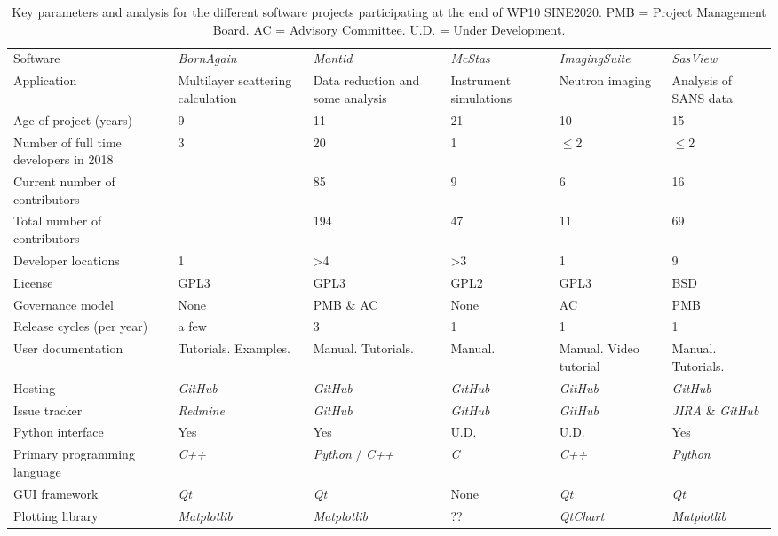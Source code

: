 \documentclass[jnr]{iosart2x}
\begin{document}
\begin{table}
 \begin{tabular}{llllll}
 Software                               & {\it BornAgain} \cite{bornagain}  & {\it Mantid} \cite{mantid} &{\it McStas} \cite{mcstas}  & {\it ImagingSuite} \cite{ImagingSuite} &{\it SasView} \cite{sasview} \\
 Application                            & Multilayer scattering calculation & Data reduction and some analysis & Instrument simulations & Neutron imaging & Analysis of SANS data \\
 Age of project (years)                 & 9 & 11 & 21 & 10 & 15 \\
 Number of full time developers in 2018 & 3 & 20 & 1 & $\le$2 & $\le$2 \\
 Current number of contributors         &  & 85  & 9 & 6 & 16 \\
 Total number of contributors           &  & 194 & 47 & 11 & 69 \\
 Developer locations                    & 1 & >4 & >3 & 1 & 9 \\
 License                                & GPL3 & GPL3 & GPL2 & GPL3 & BSD \\
 Governance model                       & None & PMB \& AC  & None & AC & PMB \\
 Release cycles (per year)              & a few & 3 & 1 & 1 & 1\\
 User documentation                     & Tutorials. Examples. & Manual. Tutorials. & Manual. & Manual. Video tutorial & Manual. Tutorials. \\
 Hosting                                & {\it GitHub} & {\it GitHub} & {\it GitHub} & {\it GitHub} & {\it GitHub} \\
 Issue tracker                          & {\it Redmine} & {\it GitHub} & {\it GitHub} & {\it GitHub} & {\it JIRA} \& {\it GitHub} \\
 Python interface                       & Yes & Yes & U.D. & U.D. & Yes \\
 Primary programming language           & {\it C++} & {\it Python} / {\it C++} & {\it C} & {\it C++} & {\it Python} \\
 GUI framework                          & {\it Qt} & {\it Qt} & None & {\it Qt} & {\it Qt} \\
 Plotting library                       & {\it Matplotlib} & {\it Matplotlib} & ?? & {\it QtChart} & {\it Matplotlib} \\
 \end{tabular}
 \caption{Key parameters and analysis for the different software projects participating at the end of WP10 SINE2020.
PMB = Project Management Board.
AC = Advisory Committee.
U.D. = Under Development.}
\label{summaryTable}
\end{table}
\end{document}

